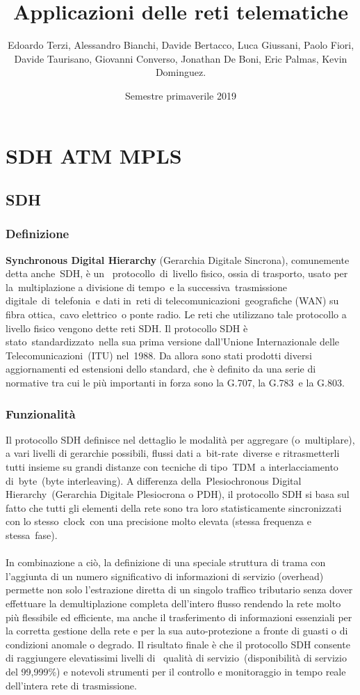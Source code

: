 \documentclass[8pt]{extarticle}
\title{\Huge Applicazioni delle reti telematiche \vspace{1cm}}
\author{Edoardo Terzi, Alessandro Bianchi, Davide Bertacco, Luca Giussani, Paolo Fiori, \\
Davide Taurisano, Giovanni Converso, Jonathan De Boni, Eric Palmas, Kevin Dominguez.\vspace{0.5cm}}
\date{Semestre primaverile 2019}
\begin{document}
\maketitle
\thispagestyle{empty}
\pagebreak

\tableofcontents
\lstset{language=C++}
\pagebreak

\section{SDH ATM MPLS}
\subsection{SDH}
\subsubsection{Definizione}
\noindent
\textbf{Synchronous Digital Hierarchy} (Gerarchia Digitale Sincrona), comunemente detta anche SDH, è un 
protocollo di livello fisico, ossia di trasporto, usato per la multiplazione a divisione di tempo e la 
successiva trasmissione digitale di telefonia e dati in reti di telecomunicazioni geografiche (WAN) su 
fibra ottica, cavo elettrico o ponte radio. Le reti che utilizzano tale protocollo a livello fisico 
vengono dette reti SDH. Il protocollo SDH è stato standardizzato nella sua prima versione dall'Unione 
Internazionale delle Telecomunicazioni (ITU) nel 1988. Da allora sono stati prodotti diversi aggiornamenti 
ed estensioni dello standard, che è definito da una serie di normative tra cui le più importanti in forza 
sono la G.707, la G.783 e la G.803.
\subsubsection{Funzionalità}
\noindent
Il protocollo SDH definisce nel dettaglio le modalità per aggregare (o multiplare), a vari livelli di 
gerarchie possibili, flussi dati a bit-rate diverse e ritrasmetterli tutti insieme su grandi distanze 
con tecniche di tipo TDM a interlacciamento di byte (byte interleaving). A differenza della Plesiochronous 
Digital Hierarchy (Gerarchia Digitale Plesiocrona o PDH), il protocollo SDH si basa sul fatto che tutti 
gli elementi della rete sono tra loro statisticamente sincronizzati con lo stesso clock con una precisione 
molto elevata (stessa frequenza e stessa fase).\\\\
In combinazione a ciò, la definizione di una speciale struttura di trama con l'aggiunta di un numero 
significativo di informazioni di servizio (overhead) permette non solo l'estrazione diretta di un singolo 
traffico tributario senza dover effettuare la demultiplazione completa dell'intero flusso rendendo la 
rete molto più flessibile ed efficiente, ma anche il trasferimento di informazioni essenziali per la 
corretta gestione della rete e per la sua auto-protezione a fronte di guasti o di condizioni anomale o 
degrado. Il risultato finale è che il protocollo SDH consente di raggiungere elevatissimi livelli di 
qualità di servizio (disponibilità di servizio del 99,999\%) e notevoli strumenti per il controllo e 
monitoraggio in tempo reale dell'intera rete di trasmissione.
\end{document}
